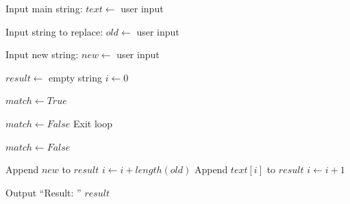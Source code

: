 \begin{algorithm}
\caption{Replace a Substring in a String}
\begin{algorithmic}[1]

\STATE Input main string:
\STATE $text \gets$ user input

\STATE Input string to replace:
\STATE $old \gets$ user input

\STATE Input new string:
\STATE $new \gets$ user input

\STATE $result \gets$ empty string
\STATE $i \gets 0$


    \STATE $match \gets True$


                \STATE $match \gets False$
                \STATE Exit loop
            \ENDIF
        \ENDFOR

    \ELSE
        \STATE $match \gets False$
    \ENDIF

        \STATE Append $new$ to $result$
        \STATE $i \gets i + length(old)$
    \ELSE
        \STATE Append $text[i]$ to $result$
        \STATE $i \gets i + 1$
    \ENDIF

\ENDWHILE

\STATE Output ``Result: '' $result$

\end{algorithmic}
\end{algorithm}